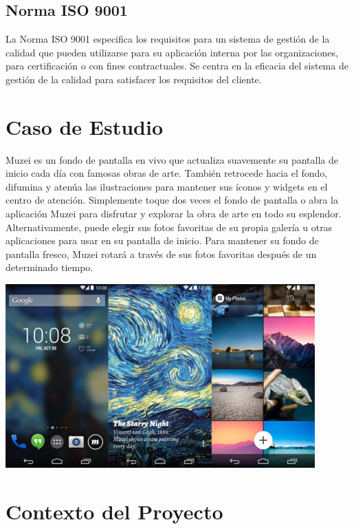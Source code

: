 \documentclass[12pt,a4paper]{article}
\begin{document}
\subsection{Norma ISO 9001}


La Norma ISO 9001 especifica los requisitos para un sistema de gestión de la calidad que pueden utilizarse para su aplicación interna por las organizaciones, para certificación o con fines contractuales. Se centra en la eficacia del sistema de gestión de la calidad para satisfacer los requisitos del cliente.\\

\section{Caso de Estudio}

Muzei es un fondo de pantalla en vivo que actualiza suavemente su pantalla de inicio cada día con famosas obras de arte. También retrocede hacia el fondo, difumina y atenúa las ilustraciones para mantener sus íconos y widgets en el centro de atención. Simplemente toque dos veces el fondo de pantalla o abra la aplicación Muzei para disfrutar y explorar la obra de arte en todo su esplendor.\\

Alternativamente, puede elegir sus fotos favoritas de su propia galería u otras aplicaciones para usar en su pantalla de inicio. Para mantener su fondo de pantalla fresco, Muzei rotará a través de sus fotos favoritas después de un determinado tiempo.\\

\begin{Imagen}
\centering
\includegraphics[scale=0.5]{Imagen.jpg}
\end{Imagen}


\section{Contexto del Proyecto}
\end{document}
